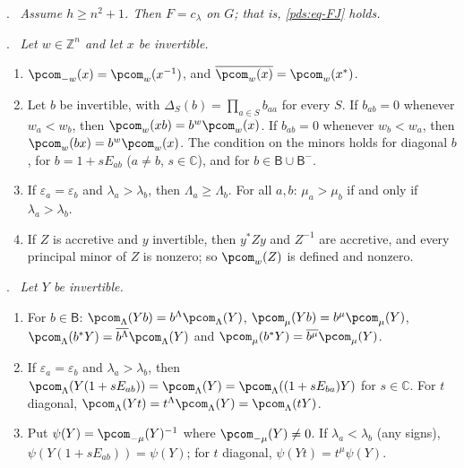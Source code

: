 \documentclass[10pt]{amsart}
\theoremstyle{definition}
\theoremstyle{remark}
\newcommand{\C}{\mathbb C}
\newcommand{\Z}{\mathbb Z}
\providecommand{\pcoB}{\mathsf B}
\newenvironment{quotedthm}[2]{\par\medskip\noindent\begingroup
  \textbf{#1}#2.\ \itshape\ignorespaces}{\endgroup\par\medskip}
\begin{document}
\begin{quotedthm}{\cite[Theorem~3.17]{P49}}{}
Assume $h\ge n^2+1$. Then $F=c_\lambda$ on $G$; that is, \eqref{pds:eq-FJ} holds.
\end{quotedthm}

\begin{quotedthm}{\cite[Lemma~3.18]{P49}}{}
Let $w\in\Z^n$ and let $x$ be invertible.
\begin{enumerate}
\item[(a)] $\pcom_{-w}(x)=\pcom_w(x^{-1})$, and $\overline{\pcom_w(x)}=\pcom_w(x^*)$.
\item[(b)] Let $b$ be invertible, with $\Delta_S(b)=\prod_{a\in S}b_{aa}$ for every $S$. If
$b_{ab}=0$ whenever $w_a<w_b$, then $\pcom_w(xb)=b^w\pcom_w(x)$. If $b_{ab}=0$ whenever
$w_b<w_a$, then $\pcom_w(bx)=b^w\pcom_w(x)$. The condition on the minors holds for diagonal $b$,
for $b=1+sE_{ab}$ \textup($a\ne b$, $s\in\C$\textup), and for $b\in\pcoB\cup\pcoB^-$.
\item[(c)] If $\varepsilon_a=\varepsilon_b$ and $\lambda_a>\lambda_b$, then $\Lambda_a\ge\Lambda_b$.
For all $a,b$: $\mu_a>\mu_b$ if and only if $\lambda_a>\lambda_b$.
\item[(d)] If $Z$ is accretive and $y$ invertible, then $y^*Zy$ and $Z^{-1}$ are accretive, and
every principal minor of $Z$ is nonzero; so $\pcom_w(Z)$ is defined and nonzero.
\end{enumerate}
\end{quotedthm}

\begin{quotedthm}{\cite[Corollary~3.19]{P49}}{}
Let $Y$ be invertible.
\begin{enumerate}
\item[(a)] For $b\in\pcoB$: $\pcom_\Lambda(Yb)=b^\Lambda\pcom_\Lambda(Y)$, $\pcom_\mu(Yb)=
b^\mu\pcom_\mu(Y)$, $\pcom_\Lambda(b^*Y)=\overline{b^\Lambda}\pcom_\Lambda(Y)$ and $\pcom_\mu(b^*Y)
=\overline{b^\mu}\pcom_\mu(Y)$.
\item[(b)] If $\varepsilon_a=\varepsilon_b$ and $\lambda_a>\lambda_b$, then $\pcom_\Lambda(Y(1+sE_{ab}))
=\pcom_\Lambda(Y)=\pcom_\Lambda((1+sE_{ba})Y)$ for $s\in\C$. For $t$ diagonal,
$\pcom_\Lambda(Yt)=t^\Lambda\pcom_\Lambda(Y)=\pcom_\Lambda(tY)$.
\item[(c)] Put $\psi(Y)=\pcom_{-\mu}(Y)^{-1}$ where $\pcom_{-\mu}(Y)\ne0$. If $\lambda_a<\lambda_b$
\textup(any signs\textup), $\psi(Y(1+sE_{ab}))=\psi(Y)$; for $t$ diagonal, $\psi(Yt)=t^\mu\psi(Y)$.
\end{enumerate}
\end{quotedthm}
\end{document}
